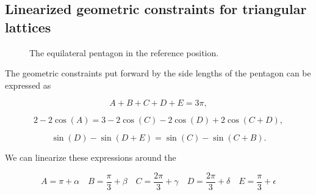 \begin{appendices}

\chapter{Linearized geometric constraints for triangular lattices}
\label{sec:triderivegeometric}

			\begin{figure}[!ht]
				\caption{The equilateral pentagon in the reference position.}
				\label{fig:trianglepent}
			\end{figure}
			
			The geometric constraints put forward by the side lengths of the pentagon can be expressed as
			
			\begin{equation}
				A+B+C+D+E = 3\pi,
				\label{eq:trianglesum}
			\end{equation}
			
			\begin{equation}
				2 - 2\cos(A) = 3 - 2 \cos(C) - 2 \cos(D) + 2 \cos(C+D),
				\label{eq:tricosinelaw}
			\end{equation}
			
			\begin{equation}
				\sin(D) - \sin(D+E) = \sin(C) - \sin(C+B).
				\label{eq:trisinelaw}
			\end{equation}
			
			We can linearize these expressions around the
			
			\begin{equation}
				A = \pi + \alpha\quad B = \frac{\pi}{3} + \beta\quad C = \frac{2\pi}{3} + \gamma\quad D = \frac{2\pi}{3} + \delta\quad E = \frac{\pi}{3} + \epsilon
				\label{eq:restriangles}
			\end{equation}
			

\end{appendices}
